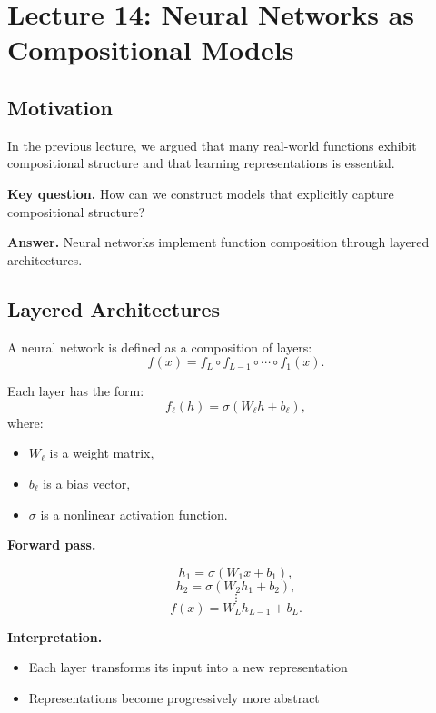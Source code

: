\section{Lecture 14: Neural Networks as Compositional Models}

\subsection{Motivation}

In the previous lecture, we argued that many real-world functions exhibit compositional structure and that learning representations is essential.

\medskip

\noindent
\textbf{Key question.}  
How can we construct models that explicitly capture compositional structure?

\medskip

\noindent
\textbf{Answer.}  
Neural networks implement function composition through layered architectures.

\subsection{Layered Architectures}

A neural network is defined as a composition of layers:
\[
f(x) = f_L \circ f_{L-1} \circ \cdots \circ f_1(x).
\]

\medskip

\noindent
Each layer has the form:
\[
f_\ell(h) = \sigma(W_\ell h + b_\ell),
\]
where:
\begin{itemize}
    \item $W_\ell$ is a weight matrix,
    \item $b_\ell$ is a bias vector,
    \item $\sigma$ is a nonlinear activation function.
\end{itemize}

\medskip

\noindent
\textbf{Forward pass.}

\[
h_1 = \sigma(W_1 x + b_1),
\]
\[
h_2 = \sigma(W_2 h_1 + b_2),
\]
\[
\vdots
\]
\[
f(x) = W_L h_{L-1} + b_L.
\]

\medskip

\noindent
\textbf{Interpretation.}
\begin{itemize}
    \item Each layer transforms its input into a new representation
    \item Representations become progressively more abstract
\end{itemize}

